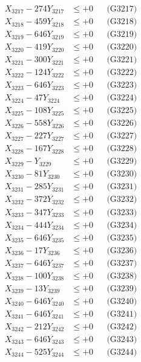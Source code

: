 \documentclass[a4paper,10pt]{article}
\begin{document}
{\begin{align}
X_{3217} - 274Y_{3217} &\leq +0 && \text{(G3217)} \\
X_{3218} - 459Y_{3218} &\leq +0 && \text{(G3218)} \\
X_{3219} - 646Y_{3219} &\leq +0 && \text{(G3219)} \\
X_{3220} - 419Y_{3220} &\leq +0 && \text{(G3220)} \\
\allowbreak
X_{3221} - 300Y_{3221} &\leq +0 && \text{(G3221)} \\
X_{3222} - 124Y_{3222} &\leq +0 && \text{(G3222)} \\
X_{3223} - 646Y_{3223} &\leq +0 && \text{(G3223)} \\
X_{3224} - 47Y_{3224} &\leq +0 && \text{(G3224)} \\
X_{3225} - 108Y_{3225} &\leq +0 && \text{(G3225)} \\
X_{3226} - 558Y_{3226} &\leq +0 && \text{(G3226)} \\
X_{3227} - 227Y_{3227} &\leq +0 && \text{(G3227)} \\
X_{3228} - 167Y_{3228} &\leq +0 && \text{(G3228)} \\
X_{3229} - Y_{3229} &\leq +0 && \text{(G3229)} \\
X_{3230} - 81Y_{3230} &\leq +0 && \text{(G3230)} \\
\allowbreak
X_{3231} - 285Y_{3231} &\leq +0 && \text{(G3231)} \\
X_{3232} - 372Y_{3232} &\leq +0 && \text{(G3232)} \\
X_{3233} - 347Y_{3233} &\leq +0 && \text{(G3233)} \\
X_{3234} - 444Y_{3234} &\leq +0 && \text{(G3234)} \\
X_{3235} - 646Y_{3235} &\leq +0 && \text{(G3235)} \\
X_{3236} - 17Y_{3236} &\leq +0 && \text{(G3236)} \\
X_{3237} - 646Y_{3237} &\leq +0 && \text{(G3237)} \\
X_{3238} - 100Y_{3238} &\leq +0 && \text{(G3238)} \\
X_{3239} - 13Y_{3239} &\leq +0 && \text{(G3239)} \\
X_{3240} - 646Y_{3240} &\leq +0 && \text{(G3240)} \\
\allowbreak
X_{3241} - 646Y_{3241} &\leq +0 && \text{(G3241)} \\
X_{3242} - 212Y_{3242} &\leq +0 && \text{(G3242)} \\
X_{3243} - 646Y_{3243} &\leq +0 && \text{(G3243)} \\
X_{3244} - 525Y_{3244} &\leq +0 && \text{(G3244)} \\

\end{align}}
\end{document}
